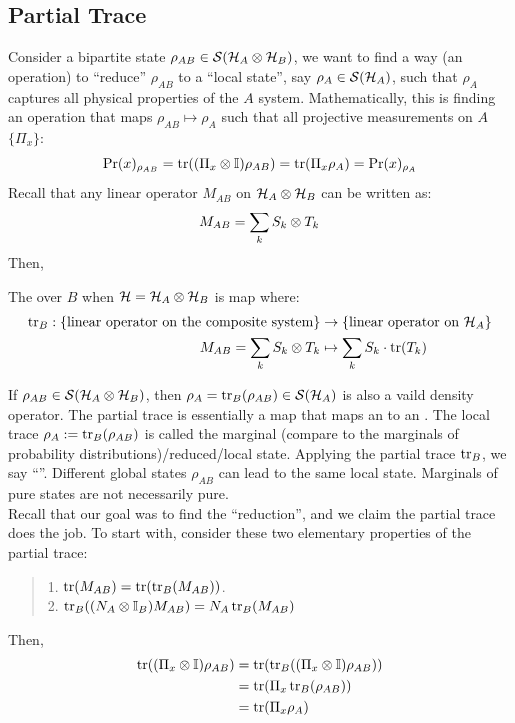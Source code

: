 \subsection{Partial Trace}
Consider a bipartite state $\rho_{AB} \in \mathcal{S}(\mathcal{H}_A \otimes \mathcal{H}_B)$, we want to find a way (an operation) to ``reduce'' $\rho_{AB}$ to a ``local state'', say $\rho_A \in \mathcal{S}(\mathcal{H}_A)$, such that $\rho_A$ captures all physical properties of the $A$ system. Mathematically, this is finding an operation that maps $\rho_{AB} \mapsto \rho_A$ such that all projective measurements on $A$ $\{\Pi_x\}$:
$$\text{Pr}(x)_{\rho_{AB}} = \tr((\Pi_x \otimes \mathbb{I})\rho_{AB}) = \tr(\Pi_x \rho_A) = \text{Pr}(x)_{\rho_A}$$
Recall that any linear operator $M_{AB}$ on $\mathcal{H}_A \otimes \mathcal{H}_B$ can be written as:
$$M_{AB} = \sum_{k} S_k \otimes T_k$$
Then,
\begin{definition}
    The  over $B$ when $\mathcal{H} = \mathcal{H}_A \otimes \mathcal{H}_B$ is map where:
    \begin{align*}
        \tr_B: \{\text{linear operator on the composite system}\} &\to \{\text{linear operator on }\mathcal{H}_A\} \\
        M_{AB} = \sum_{k} S_k \otimes T_k &\mapsto \sum_{k} S_k \cdot \tr(T_k)
    \end{align*}
\end{definition}
If $\rho_{AB} \in \mathcal{S}(\mathcal{H}_A \otimes \mathcal{H}_B)$, then $\rho_A = \tr_B(\rho_{AB}) \in \mathcal{S}(\mathcal{H}_A)$ is also a vaild density operator. The partial trace is essentially a map that maps an  to an . The local trace $\rho_A := \tr_B(\rho_{AB})$ is called the marginal (compare to the marginals of probability distributions)/reduced/local state. Applying the partial trace $\tr_B$, we say ``''. Different global states $\rho_{AB}$ can lead to the same local state. Marginals of pure states are not necessarily pure. \\
Recall that our goal was to find the ``reduction'', and we claim the partial trace does the job. To start with, consider these two elementary properties of the partial trace:
\begin{quote}
    1. $\tr(M_{AB}) = \tr(\tr_B(M_{AB}))$. \\
    2. $\tr_B((N_A \otimes \mathbb{I}_B)M_{AB}) = N_A \tr_B(M_{AB})$
\end{quote}
Then, 
\begin{align*}
    \tr((\Pi_x \otimes \mathbb{I})\rho_{AB}) &= \tr(\tr_B((\Pi_x \otimes \mathbb{I})\rho_{AB})) \\
    &= \tr(\Pi_x \tr_B(\rho_{AB})) \\
    &= \tr(\Pi_x \rho_A)
\end{align*}
